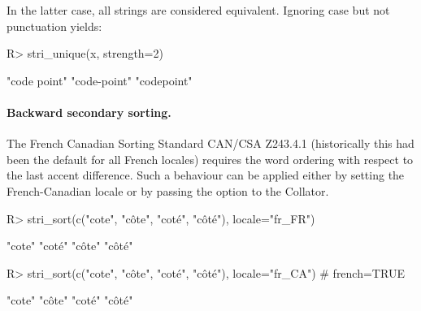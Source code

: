 \documentclass[nojss]{jss}
\begin{document}
In the latter case, all strings are considered equivalent.
Ignoring case but not punctuation yields:

\begin{Schunk}
\begin{Sinput}
R> stri_unique(x, strength=2)
\end{Sinput}
\begin{Soutput}
[1] "code point" "code-point" "codepoint"
\end{Soutput}
\end{Schunk}

%
%
%
%
%
%
%
%




\paragraph{Backward secondary sorting.}
The French Canadian Sorting Standard CAN/CSA Z243.4.1 (historically this had been
the default for all French locales) requires the word ordering with respect
to  the last accent difference. Such a behaviour can be applied
either by setting the French-Canadian locale or by passing the 
option to the Collator.

\begin{Schunk}
\begin{Sinput}
R> stri_sort(c("cote", "côte", "coté", "côté"), locale="fr_FR")
\end{Sinput}
\begin{Soutput}
[1] "cote" "coté" "côte" "côté"
\end{Soutput}
\begin{Sinput}
R> stri_sort(c("cote", "côte", "coté", "côté"), locale="fr_CA") # french=TRUE
\end{Sinput}
\begin{Soutput}
[1] "cote" "côte" "coté" "côté"
\end{Soutput}
\end{Schunk}
\end{document}
